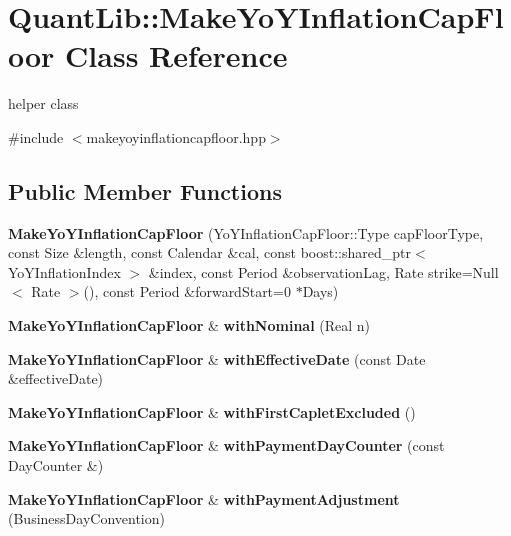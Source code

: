 \section{Quant\+Lib\+:\+:Make\+Yo\+Y\+Inflation\+Cap\+Floor Class Reference}
\label{class_quant_lib_1_1_make_yo_y_inflation_cap_floor}


helper class  




{\ttfamily \#include $<$makeyoyinflationcapfloor.\+hpp$>$}

\subsection*{Public Member Functions}
\begin{DoxyCompactItemize}
\item 
{\bfseries Make\+Yo\+Y\+Inflation\+Cap\+Floor} (Yo\+Y\+Inflation\+Cap\+Floor\+::\+Type cap\+Floor\+Type, const Size \&length, const Calendar \&cal, const boost\+::shared\+\_\+ptr$<$ Yo\+Y\+Inflation\+Index $>$ \&index, const Period \&observation\+Lag, Rate strike=Null$<$ Rate $>$(), const Period \&forward\+Start=0 $\ast$Days)\label{class_quant_lib_1_1_make_yo_y_inflation_cap_floor_a64a30e3ec6bafe25b1b084922d16dc91}

\item 
{\bf Make\+Yo\+Y\+Inflation\+Cap\+Floor} \& {\bfseries with\+Nominal} (Real n)\label{class_quant_lib_1_1_make_yo_y_inflation_cap_floor_afb59101cb5d3c43eb2af26d5758409a7}

\item 
{\bf Make\+Yo\+Y\+Inflation\+Cap\+Floor} \& {\bfseries with\+Effective\+Date} (const Date \&effective\+Date)\label{class_quant_lib_1_1_make_yo_y_inflation_cap_floor_ae74317df8521dc716d0b18a619a24002}

\item 
{\bf Make\+Yo\+Y\+Inflation\+Cap\+Floor} \& {\bfseries with\+First\+Caplet\+Excluded} ()\label{class_quant_lib_1_1_make_yo_y_inflation_cap_floor_a87c68a4db36a69f0530dc07be1c12fed}

\item 
{\bf Make\+Yo\+Y\+Inflation\+Cap\+Floor} \& {\bfseries with\+Payment\+Day\+Counter} (const Day\+Counter \&)\label{class_quant_lib_1_1_make_yo_y_inflation_cap_floor_a8c6eee87ce5d3679b2df0f93fc5de6b8}

\item 
{\bf Make\+Yo\+Y\+Inflation\+Cap\+Floor} \& {\bfseries with\+Payment\+Adjustment} (Business\+Day\+Convention)\label{class_quant_lib_1_1_make_yo_y_inflation_cap_floor_a04a952e36d11c6dde9861b145f99404f}


\end{DoxyCompactItemize}
